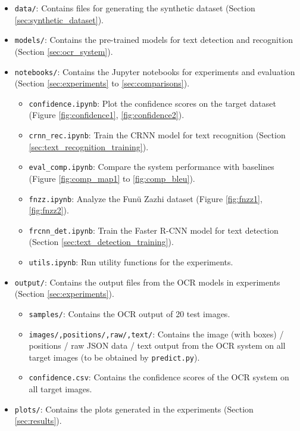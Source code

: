 \documentclass[12pt,twoside]{report}
\begin{document}
\begin{appendices}
{\fontsize{10pt}{10pt}\selectfont
\begin{itemize}[leftmargin=*]
    \item \texttt{data/}: Contains files for generating the synthetic dataset (Section \ref{sec:synthetic_dataset}).
    \item \texttt{models/}: Contains the pre-trained models for text detection and recognition (Section \ref{sec:ocr_system}).
    \item \texttt{notebooks/}: Contains the Jupyter notebooks for experiments and evaluation (Section \ref{sec:experiments} to \ref{sec:comparisons}).
    \begin{itemize}
        \item \texttt{confidence.ipynb}: Plot the confidence scores on the target dataset (Figure \ref{fig:confidence1}, \ref{fig:confidence2}).
        \item \texttt{crnn\_rec.ipynb}: Train the CRNN model for text recognition (Section \ref{sec:text_recognition_training}).
        \item \texttt{eval\_comp.ipynb}: Compare the system performance with baselines (Figure \ref{fig:comp_map1} to \ref{fig:comp_bleu}).
        \item \texttt{fnzz.ipynb}: Analyze the Funü Zazhi dataset (Figure \ref{fig:fnzz1}, \ref{fig:fnzz2}).
        \item \texttt{frcnn\_det.ipynb}: Train the Faster R-CNN model for text detection (Section \ref{sec:text_detection_training}).
        \item \texttt{utils.ipynb}: Run utility functions for the experiments.
    \end{itemize}
    \item \texttt{output/}: Contains the output files from the OCR models in experiments (Section \ref{sec:experiments}).
    \begin{itemize}
        \item \texttt{samples/}: Contains the OCR output of 20 test images.
        \item \texttt{images/,positions/,raw/,text/}: Contains the image (with boxes) / positions / raw JSON data / text output from the OCR system on all target images (to be obtained by \texttt{predict.py}).
        \item \texttt{confidence.csv}: Contains the confidence scores of the OCR system on all target images.
    \end{itemize}
    \item \texttt{plots/}: Contains the plots generated in the experiments (Section \ref{sec:results}).

\end{itemize}}
\end{appendices}
\end{document}
